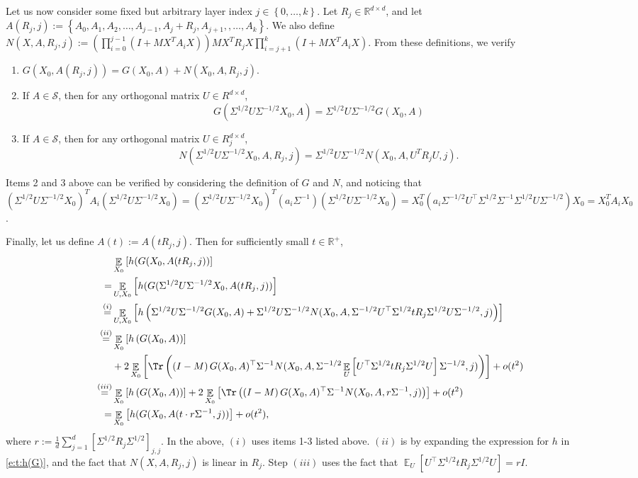 \documentclass{article}
\DeclareMathOperator{\E}{\mathbb{E}}
\newcommand{\R}{\mathbb{R}}
\renewcommand{\S}{{\mathcal S}}
\newcommand*\lrb[1]{\left[ #1 \right]}
\newcommand*\lrp[1]{\left( #1 \right)}
\newcommand*\lrbb[1]{\left\{ #1 \right\}}
\begin{document}
Let us now consider some fixed but arbitrary layer index $j \in \lrbb{0,\dots,k}$. Let $R_j\in \R^{d\times d}$, and let $A(R_j,j) := \lrbb{A_0, A_1, A_2,\dots, A_{j-1}, A_j + R_j, A_{j+1}, ,\dots, A_k}$. We also define $N(X, A, R_j, j):= \lrp{\prod_{i=0}^{j-1} (I + M X^T A_i X)} M X^T R_j X \prod_{i=j+1}^k (I + M X^T A_i X)$. From these definitions, we verify
\begin{enumerate}
\item $G(X_0, A(R_j,j)) = G(X_0,  A) + N(X_0, A, R_j, j)$.
\item If $A\in \S$, then for any orthogonal matrix $U \in R^{d\times d}$,  
$$G(\Sigma^{1/2} U \Sigma^{-1/2} X_0, A) = \Sigma^{1/2} U \Sigma^{-1/2} G(X_0,A)$$

\item If $A\in \S$, then for any orthogonal matrix $U \in R_j^{d\times d}$, 
$$N(\Sigma^{1/2} U \Sigma^{-1/2} X_0, A, R_j, j) = \Sigma^{1/2} U \Sigma^{-1/2} N(X_0, A, U^T R_j U, j).$$
\end{enumerate}
Items 2 and 3 above can be verified by considering the definition of $G$ and $N$, and noticing that $(\Sigma^{1/2} U \Sigma^{-1/2} X_0)^T A_i (\Sigma^{1/2} U \Sigma^{-1/2} X_0) = (\Sigma^{1/2} U \Sigma^{-1/2} X_0)^T (a_i \Sigma^{-1}) (\Sigma^{1/2} U \Sigma^{-1/2} X_0) = X_0^T (a_i \Sigma^{-1/2} U^\top \Sigma^{1/2} \Sigma^{-1} \Sigma^{1/2} U \Sigma^{-1/2}) X_0 = X_0^T A_i X_0$.

Finally, let us define $A(t):= A(tR_j,j)$. Then for sufficiently small $t\in \R^+$,
\begin{align*}
& \E_{X_0}\lrb{h(G(X_0, A(tR_j, j))}\\
=& \E_{U,X_0}\lrb{h(G(\Sigma^{1/2} U \Sigma^{-1/2}X_0, A(tR_j, j))}\\
\overset{(i)}{=}& \E_{U,X_0}\lrb{h\lrp{\Sigma^{1/2} U \Sigma^{-1/2}G(X_0, A) + \Sigma^{1/2} U \Sigma^{-1/2} N(X_0, A, \Sigma^{-1/2} U^\top \Sigma^{1/2} tR_j \Sigma^{1/2} U \Sigma^{-1/2},j)}}\\
\overset{(ii)}{=}& \E_{X_0}\lrb{h\lrp{G(X_0, A)}} \\
& + 2 \E_{X_0}\lrb{\Tr\lrp{\lrp{I-M} G(X_0,A)^\top \Sigma^{-1} N(X_0, A, \Sigma^{-1/2} \E_{U}\lrb{U^\top \Sigma^{1/2} tR_j \Sigma^{1/2} U} \Sigma^{-1/2},j)}} + o(t^2)\\
\overset{(iii)}{=}& \E_{X_0}\lrb{h\lrp{G(X_0, A)}} + 2 \E_{X_0}\lrb{\Tr\lrp{\lrp{I-M} G(X_0,A)^\top \Sigma^{-1} N(X_0, A, r \Sigma^{-1},j)}} + o(t^2)\\
=& \E_{X_0}\lrb{h(G(X_0, A(t\cdot r \Sigma^{-1}, j))} + o(t^2),
\end{align*}
where $r:= \frac{1}{d} \sum_{j=1}^d \lrb{\Sigma^{1/2} R_j \Sigma^{1/2}}_{j,j}$. In the above, $(i)$ uses items 1-3 listed above. $(ii)$ is by expanding the expression for $h$ in \eqref{e:t:h(G)}, and the fact that $N(X,A,R_j,j)$ is linear in $R_j$. Step $(iii)$ uses the fact that $\E_{U}\lrb{U^\top \Sigma^{1/2} tR_j \Sigma^{1/2} U} = r I$.
\end{document}
